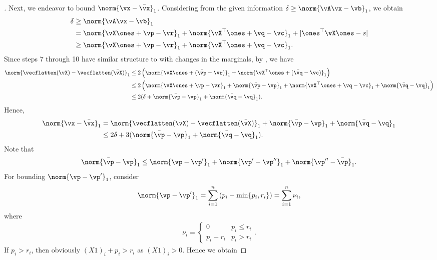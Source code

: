 \begin{proof}[\unskip \nopunct]
Next, we endeavor to bound $\norm{\vx - \bar{\vx}}_1$. Considering from the given information $\delta \geq \norm{\vA \vx - \vb}_1$, we obtain 
\begin{align*}
    \delta &\geq \norm{\vA \vx - \vb}_1 \\
    &= \norm{\vX \ones + \vp - \vr}_1 + \norm{\vX^\top \ones + \vq - \vc}_1 + |\ones^\top \vX \ones - s| \\
    &\geq \norm{\vX \ones + \vp - \vr}_1 + \norm{\vX^\top \ones + \vq - \vc}_1. 
\end{align*}
Since steps 7 through 10 have similar structure to \citep[Algorithm 2]{altschuler2017near} with changes in the marginals, by \citep[Lemma 7]{altschuler2017near}, we have 
\begin{align*}
    \norm{\vecflatten(\vX) - \vecflatten(\bar{\vX})}_1 &\leq 2 \left( \norm{\vX \ones + (\bar{\vp} - \vr)}_1 + \norm{\vX^\top \ones + (\bar{\vq} - \vc)}_1 \right) \\
    &\leq 2 \left( \norm{\vX \ones + \vp - \vr}_1 + \norm{\bar{\vp} - \vp}_1 + \norm{\vX^\top \ones + \vq - \vc}_1 + \norm{\bar{\vq} - \vq}_1\right) \\
    &\leq 2 (\delta + \norm{\bar{\vp} - \vp}_1 + \norm{\bar{\vq} - \vq}_1).
\end{align*}
Hence,
\begin{align}
    \norm{\vx - \bar{\vx}}_1 &= \norm{\vecflatten(\vX) - \vecflatten(\bar{\vX})}_1 + \norm{\bar{\vp} - \vp}_1 + \norm{\bar{\vq} - \vq}_1 \\
    &\leq 2 \delta + 3 (\norm{\bar{\vp} - \vp}_1 + \norm{\bar{\vq} - \vq}_1) \label{bound for x_bar}. 
\end{align}
Note that 
\begin{equation*}
    \norm{\bar{\vp} - \vp}_1 \leq \norm{\vp - \vp'}_1 + \norm{\vp' - \vp''}_1 + \norm{\vp'' - \bar{\vp}}_1. 
\end{equation*}
For bounding $\norm{\vp - \vp'}_1$, consider
\begin{equation*}
    \norm{\vp - \vp'}_1 = \sum_{i=1}^n \left(p_i - \min\{p_i, r_i\}\right) = \sum_{i=1}^n \nu_i,
\end{equation*}
where 
\begin{align*}
    \nu_i = \begin{cases}
        0 & p_i \leq r_i \\
        p_i - r_i & p_i > r_i
    \end{cases}.
\end{align*}
If $p_i > r_i$, then obviously $(X1)_i + p_i > r_i$ as $(X1)_i > 0$. Hence we obtain

\end{proof}
